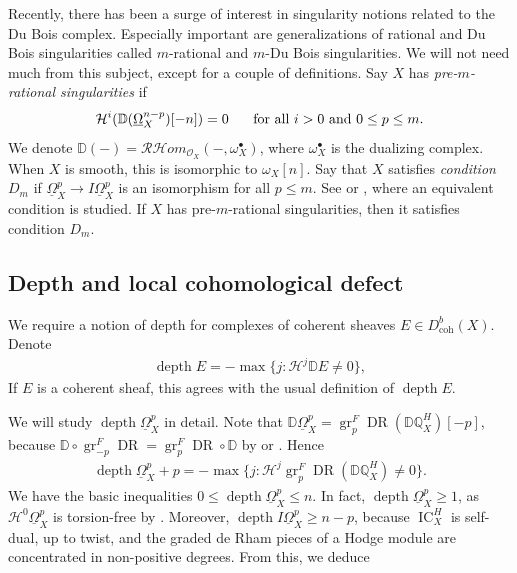 \documentclass[11pt]{amsart}
\theoremstyle{definition}
\theoremstyle{plain}
\DeclareMathOperator{\gr}{gr}
\DeclareMathOperator{\dr}{DR}
\DeclareMathOperator{\ic}{IC}
\DeclareMathOperator{\depth}{depth}
\DeclareMathOperator{\coh}{coh}
\begin{document}
Recently, there has been a surge of interest in singularity notions related to the Du Bois complex. Especially important are generalizations of rational and Du Bois singularities called $m$-rational and $m$-Du Bois singularities. We will not need much from this subject, except for a couple of definitions. Say $X$ has \emph{pre-$m$-rational singularities} \cite{shen venkatesh vo} if 
\begin{align*}
    \mathcal{H}^i ( \mathbb{D} ( \underline{\Omega}_X^{n-p})[-n] ) = 0 \hspace{.5cm} \text{ for all } i > 0 \text{ and } 0 \leq p \leq m.
\end{align*}
We denote $\mathbb{D}(-) = \mathcal{R}\mathcal{H}om_{\mathscr{O}_X}(-, \omega_X^\bullet)$, where $\omega_X^\bullet$ is the dualizing complex. When $X$ is smooth, this is isomorphic to $\omega_X[n]$. Say that $X$ satisfies \emph{condition $D_m$} if $\underline{\Omega}_X^p \rightarrow I \underline{\Omega}_X^p$ is an isomorphism for all $p \leq m$. See \cite{popa park lefschetz} or \cite{dod}, where an equivalent condition is studied. If $X$ has pre-$m$-rational singularities, then it satisfies condition $D_m$. 


\subsection{Depth and local cohomological defect}

We require a notion of depth for complexes of coherent sheaves $E \in D^b_{\coh}(X)$. Denote
\begin{align*}
    \depth E = -\max \{ j : \mathcal{H}^{j} \mathbb{D}E \neq 0 \},
\end{align*}
 If $E$ is a coherent sheaf, this agrees with the usual definition of $\depth E$. 

We will study $\depth \underline{\Omega}_X^p$ in detail. Note that $\mathbb{D} \underline{\Omega}_X^p = \gr_p^F \dr (\mathbb{D} \mathbb{Q}_X^H)[-p]$, because $\mathbb{D} \circ \gr_{-p}^F \dr = \gr_p^F \dr \circ \mathbb{D}$ by \cite[Section $2.4$]{saito 88} or \cite[Lemma $3.2$]{park}. Hence
\begin{align}\label{eqn depth du bois}
    \depth \underline{\Omega}_X^p + p = -\max \{ j :  \mathcal{H}^j \gr_p^F \dr (\mathbb{D} \mathbb{Q}_X^H) \neq 0 \}.
\end{align}
We have the basic inequalities $0 \leq \depth \underline{\Omega}_X^p \leq n$. In fact, $\depth \underline{\Omega}_X^p \geq 1$, as $\mathcal{H}^0\underline{\Omega}_X^p$ is torsion-free by \cite[Remark $3.8$]{h-topology}. Moreover, $\depth I\underline{\Omega}_X^p \geq n-p$, because $\ic_X^H$ is self-dual, up to twist, and the graded de Rham pieces of a Hodge module are concentrated in non-positive degrees. From this, we deduce
\end{document}

